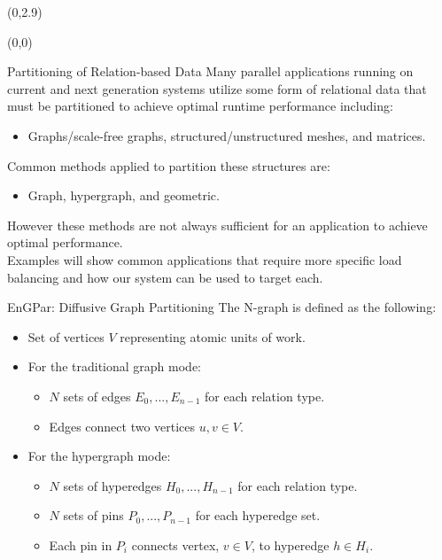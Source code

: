 \documentclass{beamer}
\begin{document}
\begin{textblock}{15.6}(0,2.9)
  \begin{textblock}{5.1}(0,0)
    \begin{block}{\centering Partitioning of Relation-based Data}
      Many parallel applications running on current and next generation systems utilize some form of relational data that must be partitioned to achieve optimal runtime performance including:
      \begin{itemize}
      \item Graphs/scale-free graphs, structured/unstructured meshes, and matrices.
      \end{itemize}
      Common methods applied to partition these structures are:
      \begin{itemize}
      \item Graph, hypergraph, and geometric.
      \end{itemize}
      However these methods are not always sufficient for an application to achieve optimal performance. \\Examples will show common applications that require more specific load balancing and how our system can be used to target each.
    \end{block}
    \begin{block}{\centering EnGPar: Diffusive Graph Partitioning}
      The N-graph is defined as the following:
      \begin{itemize}
      \item Set of vertices $V$ representing atomic units of work.
      \item For the traditional graph mode:
        \begin{itemize}
        \item $N$ sets of edges $E_0,...,E_{n-1}$ for each relation type.
        \item Edges connect two vertices $u,v \in V$.
        \end{itemize}
      \item For the hypergraph mode:
        \begin{itemize}
        \item $N$ sets of hyperedges $H_0,...,H_{n-1}$ for each relation type.
        \item $N$ sets of pins $P_0,...,P_{n-1}$ for each hyperedge set.
        \item Each pin in $P_i$ connects vertex, $v \in V$, to hyperedge $h \in H_i$.
        \end{itemize}
      \end{itemize}


\end{block}
\end{textblock}
\end{textblock}
\end{document}
